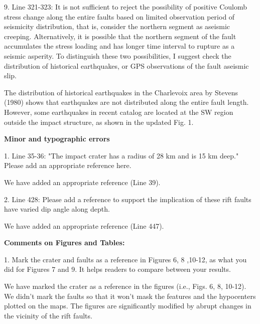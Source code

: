 \documentclass[12pt]{article}
\begin{document}
\begin{response}{9. Line 321-323: It is not sufficient to reject the possibility of positive Coulomb stress change along the entire faults based on limited observation period of seismicity distribution, that is, consider the northern segment as aseismic creeping. Alternatively, it is possible that the northern segment of the fault accumulates the stress loading and has longer time interval to rupture as a seismic asperity. To distinguish these two possibilities, I suggest check the distribution of historical earthquakes, or GPS observations of the fault aseismic slip.}

  The distribution of historical earthquakes in the Charlevoix area by Stevens (1980) shows that earthquakes are not distributed along the entire fault length. However, some earthquakes  in recent catalog are located at the SW region outside the impact structure, as shown in the updated Fig. 1.
  

\end{response}

\textbf{Minor and typographic errors} 

\begin{response}{1. Line 35-36: "The impact crater has a radius of 28 km and is 15 km deep." Please add an appropriate reference here.}

  We have added an appropriate reference (Line 39).
\end{response}

\begin{response}{2. Line 428: Please add a reference to support the implication of these rift faults have varied dip angle along depth.}

  We have added an appropriate reference (Line 447).
\end{response}

\textbf{Comments on Figures and Tables:}

\begin{response}{1. Mark the crater and faults as a reference in Figures 6, 8 ,10-12, as what you did for Figures 7 and 9. It helps readers to compare between your results.}

  We have marked the crater as a reference in the figures (i.e., Figs. 6, 8, 10-12). We didn't mark the faults so that it won't mask the features and the hypocenters plotted on the maps. The figures are significantly modified by abrupt changes in the vicinity of the rift faults.
\end{response}
\end{document}
